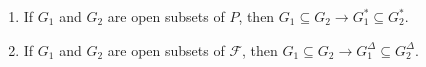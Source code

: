 \begin{enumerate}
\item If $G_1$ and $G_2$ are open subsets of $P$, then $G_1 \subseteq G_2 \rightarrow G_1^* \subseteq G_2^*$.
\item If $G_1$ and $G_2$ are open subsets of $\mathcal{F}$, then $G_1 \subseteq G_2 \rightarrow G_1^\Delta \subseteq G_2^\Delta$.
\end{enumerate}
